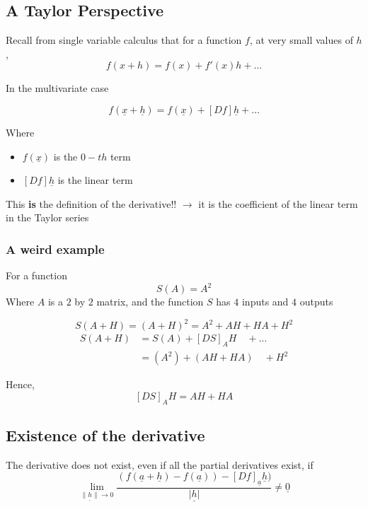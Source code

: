 \subsection{A Taylor Perspective}
\begin{framed}
Recall from single variable calculus that for a function $f$, at very small values of $h$,
\[
  f(x + h) = f(x) + f'(x)h + \hdots
\] 

In the multivariate case

\[
   f( \underline{x} + \underline{h}) = f( \underline{x}) + [Df] \underline{h} + \hdots
\] 

Where \begin{itemize}
   \item $f( \underline{x})$ is the $0-th$ term
   \item $[Df] \underline{h}$ is the linear term
\end{itemize}

This \textbf{is} the definition of the derivative!! $\rightarrow$ it is the coefficient of the linear term in the Taylor series
\end{framed}

\subsubsection{A weird example}

For a function
\[
  S(A) = A^2
\] 
Where $A$ is a $2$ by $2$ matrix, and the function $S$ has $4$ inputs and $4$ outputs

\[
  S(A+H) = (A+H)^2 = A^2 + AH + HA + H^2
\] 
\begin{align*}
   S(A+H) &= S(A) + [DS]_{A}H \quad + \hdots\\
          &= (A^2)  + (AH + HA) \quad +  H^2
\end{align*}

Hence,
\[
   [DS]_{A}H = AH + HA
\] 

\subsection{Existence of the derivative}
\begin{framed}
The derivative does not exist, even if all the partial derivatives exist, if
\[
      \lim_{ \underline{ \lVert h \rVert } \to 0} \frac{\left(f \left(  \underline{a} + \underline{h} \right)  - f \left( \underline{a} \right) \right)-[Df]_{ \underline{a}} \underline{h})}{ \underline{ | h | }} \neq \underline{0}
\] 
\end{framed}











